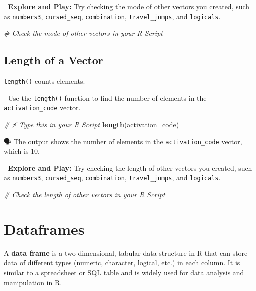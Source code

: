 \documentclass[
  12pt,
]{scrreprt}
\newenvironment{Shaded}{\begin{snugshade}}{\end{snugshade}}
\newcommand{\CommentTok}[1]{\textcolor[rgb]{0.56,0.35,0.01}{\textit{#1}}}
\newcommand{\FunctionTok}[1]{\textcolor[rgb]{0.13,0.29,0.53}{\textbf{#1}}}
\newcommand{\NormalTok}[1]{#1}
\begin{document}
🚀 \textbf{Explore and Play:} Try checking the mode of other vectors you
created, such as \texttt{numbers3}, \texttt{cursed\_seq},
\texttt{combination}, \texttt{travel\_jumps}, and \texttt{logicals}.

\begin{Shaded}
\begin{Highlighting}[]
\CommentTok{\# Check the mode of other vectors in your R Script}
\end{Highlighting}
\end{Shaded}

\section{Length of a Vector}\label{length-of-a-vector}

\texttt{length()} counts elements.

🎯 Use the \texttt{length()} function to find the number of elements in
the \texttt{activation\_code} vector.

\begin{Shaded}
\begin{Highlighting}[]
\CommentTok{\# ⚡ Type this in your R Script}
\FunctionTok{length}\NormalTok{(activation\_code)}
\end{Highlighting}
\end{Shaded}

🗣 The output shows the number of elements in the
\texttt{activation\_code} vector, which is 10.

🚀 \textbf{Explore and Play:} Try checking the length of other vectors
you created, such as \texttt{numbers3}, \texttt{cursed\_seq},
\texttt{combination}, \texttt{travel\_jumps}, and \texttt{logicals}.

\begin{Shaded}
\begin{Highlighting}[]
\CommentTok{\# Check the length of other vectors in your R Script}
\end{Highlighting}
\end{Shaded}

\chapter{Dataframes}\label{dataframes}

A \textbf{data frame} is a two-dimensional, tabular data structure in R
that can store data of different types (numeric, character, logical,
etc.) in each column. It is similar to a spreadsheet or SQL table and is
widely used for data analysis and manipulation in R.
\end{document}
